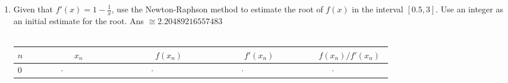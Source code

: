 \documentclass[11pt,a4paper,titlepage,oneside,openany]{article}
\numberwithin{equation}{section}
\numberwithin{algorithm}{section}
\numberwithin{figure}{section}
\numberwithin{table}{section}
\begin{document}
\begin{landscape}
\begin{enumerate}
\item
  Given that $f'(x)=1-\frac{1}{x}$, use the Newton-Raphson method to estimate the root of $f(x)$ in the interval $[0.5,3]$. Use an integer as an initial estimate for the root. \hfill Ans $\cong 2.20489216557483$
\\
\\
\begin{tabular}{|l|c|c:c:c:c:c:c:c:c:c|c|c:c:c:c:c:c:c:c:c|c|c:c:c:c:c:c:c:c:c|c|c:c:c:c:c:c:c:c:c|}\hline
$n$ & \ &  & \ &  & \ &  & \ &  \\ \hline
$0$ & \ &
\hspace{0.4em} & \hspace{0.4em} & $\cdot$ & \hspace{0.4em} & \hspace{0.4em} & \hspace{0.4em} & \hspace{0.4em} & \hspace{0.4em} & \hspace{0.4em}  & \ &
\hspace{0.4em} & \hspace{0.4em} & $\cdot$ & \hspace{0.4em} & \hspace{0.4em} & \hspace{0.4em} & \hspace{0.4em} & \hspace{0.4em} & \hspace{0.4em}  & \ &
\hspace{0.4em} & \hspace{0.4em} & $\cdot$ & \hspace{0.4em} & \hspace{0.4em} & \hspace{0.4em} & \hspace{0.4em} & \hspace{0.4em} & \hspace{0.4em}  & \ &
\hspace{0.4em} & \hspace{0.4em} & $\cdot$ & \hspace{0.4em} & \hspace{0.4em} & \hspace{0.4em} & \hspace{0.4em} & \hspace{0.4em} & \hspace{0.4em}  \\ \hline

\end{tabular}
\end{enumerate}
\end{landscape}
\end{document}
